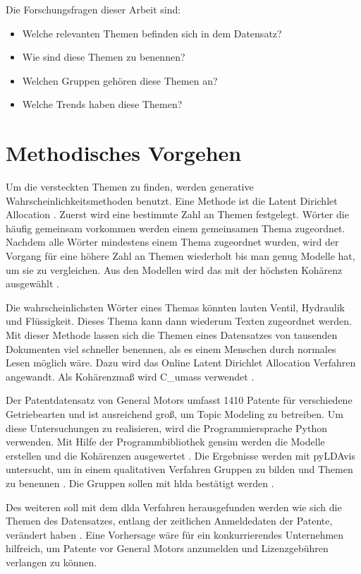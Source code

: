 Die Forschungsfragen dieser Arbeit sind:
\begin{itemize}
	\item Welche relevanten Themen befinden sich in dem Datensatz?
	\item Wie sind diese Themen zu benennen?
	\item Welchen Gruppen gehören diese Themen an?
	\item Welche Trends haben diese Themen? 
\end{itemize}

\section{Methodisches Vorgehen}
Um die versteckten Themen zu finden, werden generative Wahrscheinlichkeitsmethoden benutzt. Eine Methode ist die Latent Dirichlet Allocation \parencite[vgl.][]{Blei03latentdirichlet}. Zuerst wird eine bestimmte Zahl an Themen festgelegt. Wörter die häufig gemeinsam vorkommen werden einem gemeinsamen Thema zugeordnet. Nachdem alle Wörter mindestens einem Thema zugeordnet wurden, wird der Vorgang für eine höhere Zahl an Themen wiederholt bis man genug Modelle hat, um sie zu vergleichen. Aus den Modellen wird das mit der höchsten Kohärenz ausgewählt \parencite[vgl.][]{TopicCoherence}.

Die wahrscheinlichsten Wörter eines Themas könnten lauten Ventil, Hydraulik und Flüssigkeit. Dieses Thema kann dann wiederum Texten zugeordnet werden. Mit dieser Methode lassen sich die Themen eines Datensatzes von tausenden Dokumenten viel schneller benennen, als es einem Menschen durch normales Lesen möglich wäre. Dazu wird das Online Latent Dirichlet Allocation Verfahren angewandt. \parencite[vgl.][]{Hoffman10onlinelearning} Als Kohärenzmaß wird C\_umass verwendet \parencite[vgl.][]{TopicCoherence}.

Der Patentdatensatz von General Motors umfasst 1410 Patente für verschiedene Getriebearten und ist ausreichend groß, um Topic Modeling zu betreiben. Um diese Untersuchungen zu realisieren, wird die Programmiersprache Python verwenden. Mit Hilfe der Programmbibliothek gensim werden die Modelle erstellen und die Kohärenzen ausgewertet \parencite[vgl.][]{rehurek_lrec}. Die Ergebnisse werden mit \gls{pyLDAvis} untersucht, um in einem qualitativen Verfahren Gruppen zu bilden und Themen zu benennen \parencite[vgl.][]{sievert2014ldavis}. Die Gruppen sollen mit \gls{hlda} bestätigt werden \parencite[vgl.][]{griffiths2004hierarchical}.

Des weiteren soll mit dem \gls{dlda} Verfahren herausgefunden werden wie sich die Themen des Datensatzes, entlang der zeitlichen Anmeldedaten der Patente, verändert haben \parencite[vgl.][]{dynamicLDA}. Eine Vorhersage wäre für ein konkurrierendes Unternehmen hilfreich, um Patente vor General Motors anzumelden und Lizenzgebühren verlangen zu können.















